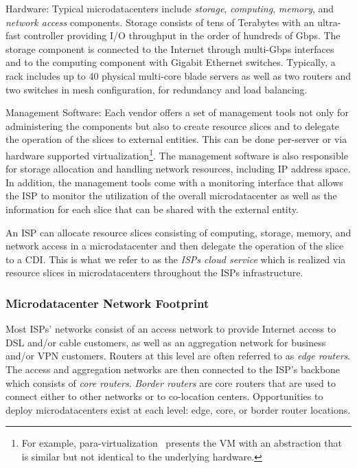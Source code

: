 \begin{description*} \item [Hardware:] Typical microdatacenters include
\emph{storage}, \emph{computing}, \emph{memory}, and \emph{network access}
components.  Storage consists of tens of Terabytes with an ultra-fast
controller providing I/O throughput in the order of hundreds of Gbps. The
storage component is connected to the Internet through multi-Gbps interfaces
and to the computing component with Gigabit Ethernet switches.  Typically, a
rack includes up to 40 physical multi-core blade servers as well as two routers
and two switches in mesh configuration, for redundancy and load balancing.
\item [Management Software:] Each vendor offers a set of management tools not
only for administering the components but also to create resource slices and to
delegate the operation of the slices to external entities. This can be done
per-server or via hardware supported virtualization\footnote{ For example,
para-virtualization~\cite{virtualization} presents the VM with an abstraction
that is similar but not identical to the underlying hardware.}. The management
software is also responsible for storage allocation and handling network
resources, including IP address space. In addition, the management tools come
with a monitoring interface that allows the ISP to monitor the utilization of
the overall microdatacenter as well as the information for each slice that can
be shared with the external entity.  \end{description*}

An ISP can allocate resource slices consisting of computing, storage, memory,
and network access in a microdatacenter and then delegate the operation of the
slice to a CDI. This is what we refer to as the \emph{ISPs cloud service} which
is realized via resource slices in microdatacenters throughout the ISPs
infrastructure.

\subsubsection{Microdatacenter Network Footprint}\label{sec:microdatacenters-footptint}

Most ISPs' networks consist of an access network to provide Internet access to
DSL and/or cable customers, as well as an aggregation network for business
and/or VPN customers. Routers at this level are often referred to as {\em edge
routers}.  The access and aggregation networks are then connected to the ISP's
backbone which consists of {\em core routers}.  {\it Border routers} are core
routers that are used to connect either to other networks or to co-location
centers.  Opportunities to deploy microdatacenters exist at each level: edge,
core, or border router locations.

